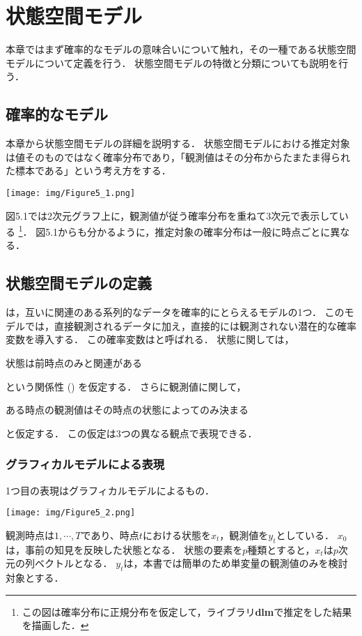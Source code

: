 \documentclass[11pt,a4paper]{jsarticle}
\numberwithin{equation}{section}
\begin{document}
\setcounter{section}{4}
\section{状態空間モデル}
本章ではまず確率的なモデルの意味合いについて触れ，その一種である状態空間モデルについて定義を行う．
状態空間モデルの特徴と分類についても説明を行う．

\subsection{確率的なモデル}
本章から状態空間モデルの詳細を説明する．
状態空間モデルにおける推定対象は値そのものではなく確率分布であり，「観測値はその分布からたまたま得られた標本である」という考え方をする．
\begin{center}
\texttt{[image: img/Figure5\_1.png]}
\end{center}

図5.1では2次元グラフ上に，観測値が従う確率分布を重ねて3次元で表示している
\footnote{
この図は確率分布に正規分布を仮定して，ライブラリ{\bf dlm}で推定をした結果を描画した．
}．
図5.1からも分かるように，推定対象の確率分布は一般に時点ごとに異なる．

\subsection{状態空間モデルの定義}
は，互いに関連のある系列的なデータを確率的にとらえるモデルの1つ．
このモデルでは，直接観測されるデータに加え，直接的には観測されない潜在的な確率変数を導入する．
この確率変数はと呼ばれる．
状態に関しては，

\centerline{状態は前時点のみと関連がある}

という関係性 () を仮定する．
さらに観測値に関して，

\centerline{ある時点の観測値はその時点の状態によってのみ決まる}

と仮定する．
この仮定は3つの異なる観点で表現できる．

\subsubsection{グラフィカルモデルによる表現}
1つ目の表現はグラフィカルモデルによるもの．
\begin{center}
\texttt{[image: img/Figure5\_2.png]}
\end{center}

観測時点は$1, \cdots, T$であり、時点$t$における状態を$x_t$，観測値を$y_t$としている．
$x_0$は，事前の知見を反映した状態となる．
状態の要素を$p$種類とすると，$x_t$は$p$次元の列ベクトルとなる．
$y_t$は，本書では簡単のため単変量の観測値のみを検討対象とする．
\end{document}
